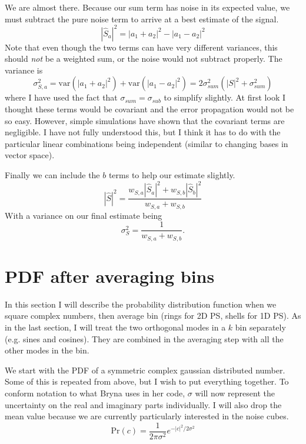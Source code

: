 \documentclass{article}
\begin{document}
We are almost there. Because our sum term has noise in its expected value, we must subtract the pure noise term to arrive at a best estimate of the signal.
\begin{equation}
\left|\hat{S}_a\right|^2 = \left|a_1+a_2\right|^2 - \left|a_1-a_2\right|^2
\end{equation}
Note that even though the two terms can have very different variances, this should \emph{not} be a weighted sum, or the noise would not subtract properly. The variance is
\begin{equation}
\sigma^2_{S,a} = \mathrm{var}\left(\left|a_1+a_2\right|^2\right) + \mathrm{var}\left(\left|a_1-a_2\right|^2\right) = 2 \sigma_{sum}^2\left(|S|^2 + \sigma_{sum}^2\right)
\end{equation}
where I have used the fact that $\sigma_{sum}=\sigma_{sub}$ to simplify slightly. At first look I thought these terms would be covariant and the error propagation would not be so easy. However, simple simulations have shown that the covariant terms are negligible. I have not fully understood this, but I think it has to do with the particular linear combinations being independent (similar to changing bases in vector space).


Finally we can include the $b$ terms to help our estimate slightly. 
\begin{equation}
\left|\hat{S}\right|^2 = \frac{w_{S,a}\left|\hat{S}_a\right|^2 + w_{S,b}\left|\hat{S}_b\right|^2}{w_{S,a}+w_{S,b}}
\end{equation}
With a variance on our final estimate being
\begin{equation}
\sigma^2_S = \frac{1}{w_{S,a}+w_{S,b}}.
\end{equation}

\section{PDF after averaging bins}

In this section I will describe the probability distribution function when we square complex numbers, then average bin (rings for 2D PS, shells for 1D PS). As in the last section, I will treat the two orthogonal modes in a $k$ bin separately (e.g. sines and cosines). They are combined in the averaging step with all the other modes in the bin.

We start with the PDF of a symmetric complex gaussian distributed number. Some of this is repeated from above, but I wish to put everything together. To conform notation to what Bryna uses in her code, $\sigma$ will now represent the uncertainty on the real and imaginary parts individually. I will also drop the mean value because we are currently particularly interested in the noise cubes.
\begin{equation}
\mathrm{Pr}(c) = \frac{1}{2\pi \sigma^2}e^{-|c|^2/2\sigma^2}
\end{equation}
\end{document}
